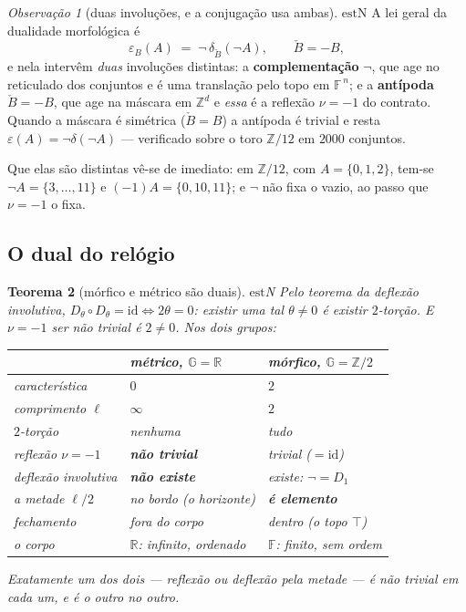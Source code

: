 \documentclass[11pt]{article}
\theoremstyle{plain}
\newtheorem{teorema}{Teorema}
\theoremstyle{remark}
\providecommand{\est}{\ensuremath{\mathrm{est}}}
\providecommand{\FF}{\ensuremath{\mathbb{F}}}
\providecommand{\GG}{\ensuremath{\mathbb{G}}}
\providecommand{\RR}{\ensuremath{\mathbb{R}}}
\providecommand{\ZZ}{\ensuremath{\mathbb{Z}}}
\newtheorem{corolario}[teorema]{Observação}
\begin{document}
\begin{corolario}[duas involuções, e a conjugação usa ambas]\label{cor:conjuga}
\est{N} A lei geral da dualidade morfológica é
\[
\varepsilon_B(A)\;=\;\neg\,\delta_{\check B}(\neg A),
\qquad \check B=-B,
\]
e nela intervêm \emph{duas} involuções distintas: a \textbf{complementação} $\neg$, que age no reticulado dos
conjuntos e é uma translação pelo topo em $\FF^{\,n}$; e a \textbf{antípoda} $\check B=-B$, que age na máscara em
$\ZZ^d$ e \emph{essa} é a reflexão $\nu=-1$ do contrato. Quando a máscara é simétrica ($\check B=B$) a antípoda é
trivial e resta $\varepsilon(A)=\neg\delta(\neg A)$ --- verificado sobre o toro $\ZZ/12$ em $2000$ conjuntos.

\noindent Que elas são distintas vê-se de imediato: em $\ZZ/12$, com $A=\{0,1,2\}$, tem-se
$\neg A=\{3,\dots,11\}$ e $(-1)A=\{0,10,11\}$; e $\neg$ não fixa o vazio, ao passo que $\nu=-1$ o fixa.
\end{corolario}

\subsection{O dual do relógio}

\begin{teorema}[mórfico e métrico são duais]\label{teo:dualmetrico}
\est{N} Pelo teorema da deflexão involutiva, $D_\theta\circ D_\theta=\mathrm{id}\iff2\theta=0$: existir uma tal
$\theta\neq0$ \emph{é} existir $2$-torção. E $\nu=-1$ ser não trivial \emph{é} $2\neq0$. Nos dois grupos:
\begin{center}
\renewcommand{\arraystretch}{1.3}
\begin{tabular}{lll}
\hline
& \textbf{métrico}, $\GG=\RR$ & \textbf{mórfico}, $\GG=\ZZ/2$\\
\hline
característica & $0$ & $2$\\
comprimento $\ell$ & $\infty$ & $2$\\
$2$-torção & nenhuma & tudo\\
reflexão $\nu=-1$ & \textbf{não trivial} & trivial ($=\mathrm{id}$)\\
deflexão involutiva & \textbf{não existe} & existe: $\neg=D_1$\\
a metade $\ell/2$ & no bordo (o horizonte) & \textbf{é elemento}\\
fechamento & fora do corpo & dentro (o topo $\top$)\\
o corpo & $\RR$: infinito, ordenado & $\FF$: finito, sem ordem\\
\hline
\end{tabular}
\end{center}
\emph{Exatamente um dos dois --- reflexão ou deflexão pela metade --- é não trivial em cada um, e é o outro no
outro.}
\end{teorema}
\end{document}
